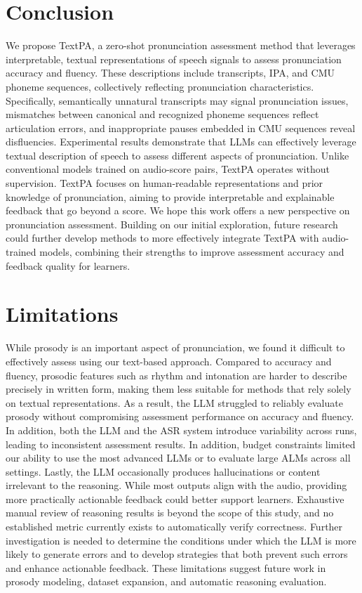 \documentclass[11pt]{article}
\begin{document}
\section{Conclusion}

We propose TextPA, a zero-shot pronunciation assessment method that leverages interpretable, textual representations of speech signals to assess pronunciation accuracy and fluency. These descriptions include transcripts, IPA, and CMU phoneme sequences, collectively reflecting pronunciation characteristics. Specifically, semantically unnatural transcripts may signal pronunciation issues, mismatches between canonical and recognized phoneme sequences reflect articulation errors, and inappropriate pauses embedded in CMU sequences reveal disfluencies. Experimental results demonstrate that LLMs can effectively leverage textual description of speech to assess different aspects of pronunciation. Unlike conventional models trained on audio-score pairs, TextPA operates without supervision. TextPA focuses on human-readable representations and prior knowledge of pronunciation, aiming to provide interpretable and explainable feedback that go beyond a score. We hope this work offers a new perspective on pronunciation assessment. Building on our initial exploration, future research could further develop methods to more effectively integrate TextPA with audio-trained models, combining their strengths to improve assessment accuracy and feedback quality for learners.

\section*{Limitations}

While prosody is an important aspect of pronunciation, we found it difficult to effectively assess using our text-based approach. Compared to accuracy and fluency, prosodic features such as rhythm and intonation are harder to describe precisely in written form, making them less suitable for methods that rely solely on textual representations. As a result, the LLM struggled to reliably evaluate prosody without compromising assessment performance on accuracy and fluency. In addition, both the LLM and the ASR system introduce variability across runs, leading to inconsistent assessment results. In addition, budget constraints limited our ability to use the most advanced LLMs or to evaluate large ALMs across all settings. Lastly, the LLM occasionally produces hallucinations or content irrelevant to the reasoning. While most outputs align with the audio, providing more practically actionable feedback could better support learners. Exhaustive manual review of reasoning results is beyond the scope of this study, and no established metric currently exists to automatically verify correctness. Further investigation is needed to determine the conditions under which the LLM is more likely to generate errors and to develop strategies that both prevent such errors and enhance actionable feedback. These limitations suggest future work in prosody modeling, dataset expansion, and automatic reasoning evaluation.
\end{document}
